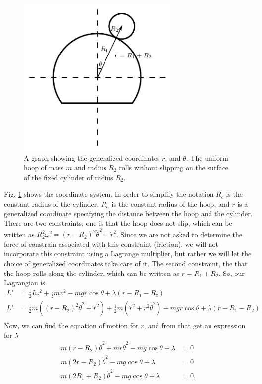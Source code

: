 \documentclass[10pt]{article}
\begin{document}
\begin{figure}[h!]
    \centering
    \includegraphics[width=0.7\textwidth]{Ex14.png}
    \caption{A graph showing the generalized coordinates $r$, and $\theta$.  The uniform hoop of mass $m$ and radius $R_2$ rolls without slipping on the surface of the fixed cylinder of radius $R_2$.}
  \label{fig:ex14}
\end{figure}
Fig. \ref{fig:ex14} shows the coordinate system. In order to simplify 
the notation $R_c$ is the constant radius of the cylinder, $R_h$ is the 
constant radius of the hoop, and $r$ is a generalized coordinate specifying 
the distance between the hoop and the cylinder.  There are two
constraints, one is that the hoop does not slip, which can be written 
as $R_2^2\omega^2 = (r-R_2)^2\dot\theta^2 + \dot r^2$.  Since we are
not asked to determine the force of constrain associated with this
constraint (friction), we will not incorporate this constraint using a
Lagrange multiplier, but rather we will let the choice of generalized 
coordinates take care of it.  The second constraint, the that the hoop 
rolls along the cylinder, which can be written as $r = R_1+R_2$.  So, our 
Lagrangian is
\begin{align*}
  L' &= \frac{1}{2}I\omega^2 + \frac{1}{2}mv^2 - mgr\cos\theta + \lambda(r-R_1-R_2)\\
  L' &= \frac{1}{2}m((r-R_2)^2\dot\theta^2 + \dot r^2) + \frac{1}{2}m(\dot r^2+r^2\dot\theta^2) - mgr\cos\theta + \lambda(r-R_1-R_2)\\
\end{align*}
Now, we can find the equation of motion for $r$, and from that get an expression for $\lambda$
\begin{align}
  m(r-R_2)\dot\theta^2 + mr\dot\theta^2-mg\cos\theta + \lambda &= 0\nonumber\\
  m(2r-R_2)\dot\theta^2 - mg\cos\theta + \lambda &= 0\nonumber\\
  m(2R_1+R_2)\dot\theta^2 - mg\cos\theta + \lambda &= 0,\label{eq:ex14Constraint}
\end{align}
\end{document}
